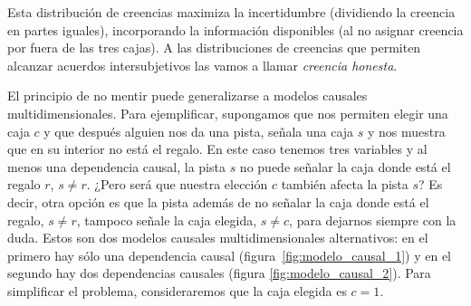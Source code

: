 \documentclass[a4paper,11pt]{book}
\theoremstyle{definition}
\begin{document}
%
Esta distribución de creencias maximiza la incertidumbre (dividiendo la creencia en partes iguales), incorporando la información disponibles (al no asignar creencia por fuera de las tres cajas).
%
A las distribuciones de creencias que permiten alcanzar acuerdos intersubjetivos las vamos a llamar \emph{creencia honesta}.


El principio de no mentir puede generalizarse a modelos causales multidimensionales.
%
Para ejemplificar, supongamos que nos permiten elegir una caja $c$ y que después alguien nos da una pista, señala una caja $s$ y nos muestra que en su interior no está el regalo.
%
En este caso tenemos tres variables y al menos una dependencia causal, la pista $s$ no puede señalar la caja donde está el regalo $r$, $s \neq r$.
%
¿Pero será que nuestra elección $c$ también afecta la pista $s$?
%
Es decir, otra opción es que la pista además de no se\~nalar la caja donde está el regalo, $s \neq r$, tampoco se\~nale la caja elegida, $s \neq c$, para dejarnos siempre con la duda.
%
Estos son dos modelos causales multidimensionales alternativos: en el primero hay sólo una dependencia causal (figura~\ref{fig:modelo_causal_1}) y en el segundo hay dos dependencias causales (figura \ref{fig:modelo_causal_2}).
%
Para simplificar el problema, consideraremos que la caja elegida es $c=1$.

\end{document}
